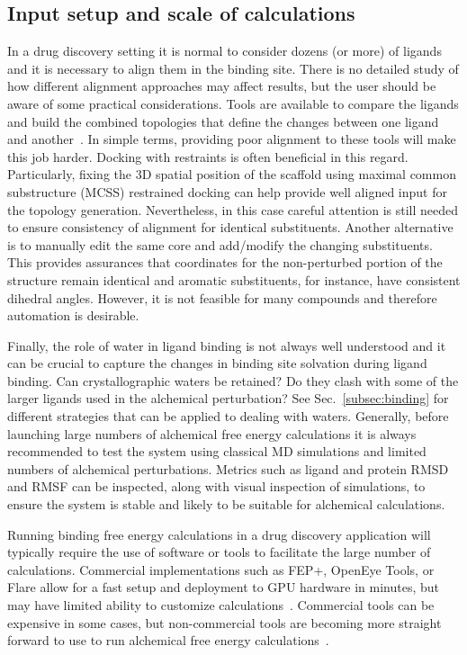\documentclass[9pt,bestpractices]{livecoms}
\begin{document}
\subsection{Input setup and scale of calculations}
In a drug discovery setting it is normal to consider dozens (or more) of ligands and it is necessary to align them in the binding site. There is no detailed study of how different alignment approaches may affect results, but the user should be aware of some practical considerations. Tools are available to compare the ligands and build the combined topologies that define the changes between one ligand and another~\cite{loeffler2015fesetup,hedges2019biosimspace,gapsys2015pmx}. In simple terms, providing poor alignment to these tools will make this job harder. Docking with restraints is often beneficial in this regard. Particularly, fixing the 3D spatial position of the scaffold using maximal common substructure (MCSS) restrained docking can help provide well aligned input for the topology generation. Nevertheless, in this case careful attention is still needed to ensure consistency of alignment for identical substituents. Another alternative is to manually edit the same core and add/modify the changing substituents. This provides assurances that coordinates for the non-perturbed portion of the structure remain identical and aromatic substituents, for instance, have consistent dihedral angles. However, it is not feasible for many compounds and therefore automation is desirable. 

Finally, the role of water in ligand binding is not always well understood and it can be crucial to capture the changes in binding site solvation during ligand binding. Can crystallographic waters be retained? Do they clash with some of the larger ligands used in the alchemical perturbation? See Sec.~\ref{subsec:binding} for different strategies that can be applied to dealing with waters. Generally, before launching large numbers of alchemical free energy calculations it is always recommended to test the system using classical MD simulations and limited numbers of alchemical perturbations. Metrics such as ligand and protein RMSD and RMSF can be inspected, along with visual inspection of simulations, to ensure the system is stable and likely to be suitable for alchemical calculations. 

Running binding free energy calculations in a drug discovery application will typically require the use of software or tools to facilitate the large number of calculations. Commercial implementations such as FEP+, OpenEye Tools, or Flare allow for a fast setup and deployment to GPU hardware in minutes, but may have limited ability to customize calculations~\cite{wang2015accurate,kuhn2020assessment}. Commercial tools can be expensive in some cases, but non-commercial tools are becoming more straight forward to use to run alchemical free energy calculations~\cite{gapsys2015pmx, loeffler2015fesetup, song2019using, gapsys2020large, jespers2019qligfep, hedges2019biosimspace, kuhn2020assessment}.
\end{document}
